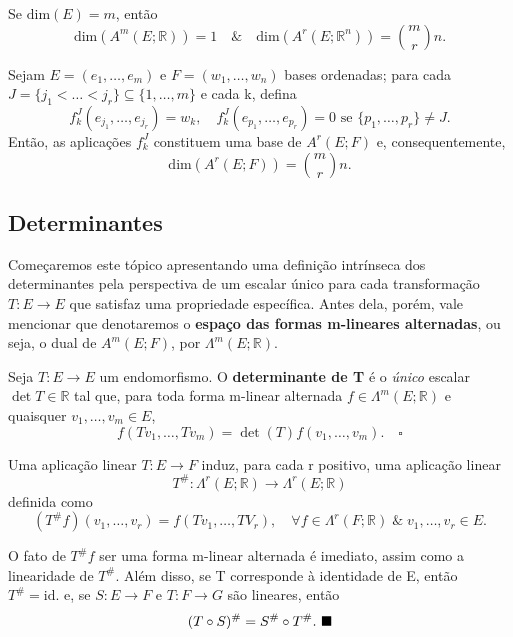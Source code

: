 \documentclass[../differential_forms.tex]{subfiles}
\begin{document}
\begin{crl*}
	Se \(\mathrm{dim}(E) = m\), então
	\[
		\mathrm{dim}(A^{m}(E; \mathbb{R}))=1 \quad\&\quad \mathrm{dim}(A^{r}(E; \mathbb{R}^{n}))= \binom{m}{r}n.
	\]
\end{crl*}
\begin{prop*}
	Sejam \(E=(e_1,\dotsc ,e_{m})\) e \(F=(w_1,\dotsc ,w_{n})\) bases ordenadas; para cada \(J=\{j_1<\dotsc <j_r\}\subseteq \{1,\dotsc ,m\}\) e cada k, defina
	\[
		f_{k}^{J}(e_{j_1}, \dotsc , e_{j_r}) = w_{k}, \quad f_{k}^{J}(e_{p_1}, \dotsc , e_{p_r})=0 \text{ se }\{p_1,\dotsc , p_r\}\neq J.
	\]
	Então, as aplicações \(f_{k}^{J}\) constituem uma base de \(A^{r}(E; F)\) e, consequentemente,
	\[
		\mathrm{dim}(A^{r}(E; F))=\binom{m}{r}n.
	\]
\end{prop*}
\subsection{Determinantes}
Começaremos este tópico apresentando uma definição intrínseca dos determinantes pela perspectiva de um escalar único para cada transformação \(T:E\rightarrow E\) que satisfaz uma propriedade específica. Antes dela, porém, vale mencionar que denotaremos o \textbf{espaço das formas m-lineares alternadas}, ou seja, o dual de \(A^{m}(E; F)\), por \(\Lambda^{m}(E; \mathbb{R})\).
\begin{def*}
	Seja \(T:E\rightarrow E\) um endomorfismo. O \textbf{determinante de T} é o \textit{único} escalar \(\det{T}\in \mathbb{R}\) tal que, para toda forma m-linear alternada \(f\in \Lambda^{m}(E; \mathbb{R})\) e quaisquer \(v_1,\dotsc , v_{m}\in E\),
	\[
		f(Tv_1,\dotsc , Tv_{m}) = \det{(T)} f(v_1,\dotsc ,v_{m}). \quad \square
	\]
\end{def*}
\begin{prop*}
	Uma aplicação linear \(T:E\rightarrow F\) induz, para cada r positivo, uma aplicação linear
	\[
		T^{\#}: \Lambda^{r}(E; \mathbb{R})\rightarrow \Lambda^{r}(E; \mathbb{R})
	\]
	definida como
	\[
		(T^{\#}f)(v_1,\dotsc ,v_r)= f(Tv_1,\dotsc ,TV_r),\quad \forall f\in \Lambda ^{r}(F; \mathbb{R})\;\&\; v_1,\dotsc ,v_r\in E.
	\]
\end{prop*}
\begin{proof*}
	O fato de \(T^{\#}f\) ser uma forma m-linear alternada é imediato, assim como a linearidade de \(T^{\#}.\) Além disso, se T corresponde à identidade de E, então \(T^{\#}=\mathrm{id}.\) e, se \(S:E\rightarrow F\) e \(T:F\rightarrow G\) são lineares, então
	\[
		(T \circ S)^{\#}=S^{\#}\circ T^{\#}.\text{ $\blacksquare$}
	\]
\end{proof*}
\end{document}

